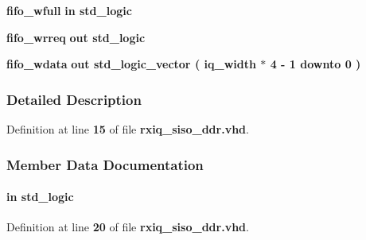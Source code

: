 \begin{DoxyCompactItemize}
\item 
{\bf fifo\+\_\+wfull}  {\bfseries {\bfseries \textcolor{keywordflow}{in}\textcolor{vhdlchar}{ }}} {\bfseries \textcolor{comment}{std\+\_\+logic}\textcolor{vhdlchar}{ }} 
\item 
{\bf fifo\+\_\+wrreq}  {\bfseries {\bfseries \textcolor{keywordflow}{out}\textcolor{vhdlchar}{ }}} {\bfseries \textcolor{comment}{std\+\_\+logic}\textcolor{vhdlchar}{ }} 
\item 
{\bf fifo\+\_\+wdata}  {\bfseries {\bfseries \textcolor{keywordflow}{out}\textcolor{vhdlchar}{ }}} {\bfseries \textcolor{comment}{std\+\_\+logic\+\_\+vector}\textcolor{vhdlchar}{ }\textcolor{vhdlchar}{(}\textcolor{vhdlchar}{ }\textcolor{vhdlchar}{ }\textcolor{vhdlchar}{ }\textcolor{vhdlchar}{ }{\bfseries {\bf iq\+\_\+width}} \textcolor{vhdlchar}{$\ast$}\textcolor{vhdlchar}{ } \textcolor{vhdldigit}{4} \textcolor{vhdlchar}{-\/}\textcolor{vhdlchar}{ } \textcolor{vhdldigit}{1} \textcolor{vhdlchar}{ }\textcolor{keywordflow}{downto}\textcolor{vhdlchar}{ }\textcolor{vhdlchar}{ } \textcolor{vhdldigit}{0} \textcolor{vhdlchar}{ }\textcolor{vhdlchar}{)}\textcolor{vhdlchar}{ }} 
\end{DoxyCompactItemize}


\subsubsection{Detailed Description}


Definition at line {\bf 15} of file {\bf rxiq\+\_\+siso\+\_\+ddr.\+vhd}.



\subsubsection{Member Data Documentation}
\paragraph[{clk}]{ {\bfseries \textcolor{keywordflow}{in}\textcolor{vhdlchar}{ }} {\bfseries \textcolor{comment}{std\+\_\+logic}\textcolor{vhdlchar}{ }} \hspace{0.3cm}{\ttfamily [Port]}}\label{classrxiq__siso__ddr_a4a4609c199d30b3adebbeb3a01276ec5}


Definition at line {\bf 20} of file {\bf rxiq\+\_\+siso\+\_\+ddr.\+vhd}.

